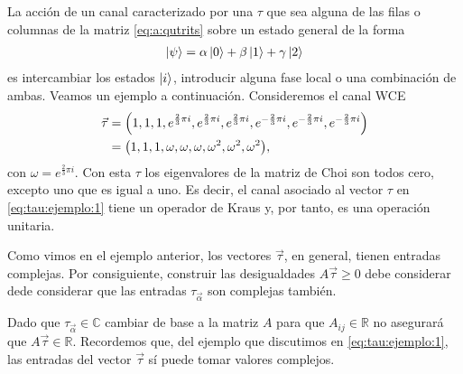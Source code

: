 La acción de un canal caracterizado por una $\tau$ que sea alguna
de las filas o columnas de la matriz \eqref{eq:a:qutrits} 
sobre un estado general de la forma
\begin{align}
\ket{\psi} = \alpha \ket{0} + \beta \ket{1} + \gamma \ket{2}
\end{align}
es intercambiar los estados $\ket{i}$, introducir alguna fase
local o una combinación de ambas. Veamos un ejemplo a continuación.
Consideremos el canal WCE 
\begin{align}
\vec \tau &= \qty(1, 1, 1,
e^{\frac{2}{3}\pi i}, e^{\frac{2}{3}\pi i}, e^{\frac{2}{3}\pi i},
e^{-\frac{2}{3}\pi i}, e^{-\frac{2}{3}\pi i}, e^{-\frac{2}{3}\pi i}) \\
&=\qty(1,1,1,\omega,\omega,\omega,\omega^2,\omega^2,\omega^2),
\label{eq:tau:ejemplo:1}
\end{align}
con $\omega=e^{\frac{2}{3}\pi i}$. Con esta $\tau$ los 
eigenvalores de la matriz de Choi son todos cero, excepto 
uno que es igual a uno. Es decir, el canal asociado al 
vector $\tau$ en \eqref{eq:tau:ejemplo:1} tiene un operador 
de Kraus y, por tanto, es una operación unitaria. 

Como vimos en el ejemplo anterior, los vectores $\vec \tau$,
en general, tienen entradas complejas. Por consiguiente, 
construir las desigualdades $A\vec \tau \geq 0$ debe considerar
dede considerar que las entradas $\tau_{\vec \alpha}$ son 
complejas también.

Dado que $\tau_{\vec \alpha}\in \mathbb{C}$ cambiar de base 
a la matriz $A$ para que $A_{ij}\in \mathbb{R}$ no asegurará 
que $A\vec \tau \in \mathbb{R}$. Recordemos que, del ejemplo
que discutimos en \eqref{eq:tau:ejemplo:1}, las entradas 
del vector $\vec \tau$ sí puede tomar valores complejos.